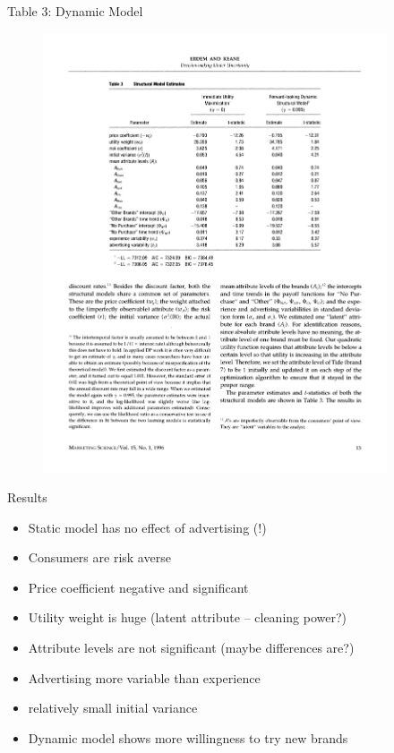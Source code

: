 \documentclass[xcolor=pdftex,dvipsnames,table,mathserif]{beamer}
\begin{document}
\begin{frame}{Table 3: Dynamic Model}
\begin{figure}[htbp]
\begin{center}
\includegraphics[width=4in]{resources/ek2.pdf}
\label{default}
\end{center}
\end{figure}
\end{frame}

\begin{frame}{Results}
\begin{itemize}
\item Static model has no effect of advertising (!)
\item Consumers are risk averse
\item Price coefficient negative and significant
\item Utility weight is huge (latent attribute -- cleaning power?)
\item Attribute levels are not significant (maybe differences are?)
\item Advertising more variable than experience
\item relatively small initial variance
\item Dynamic model shows \alert{more willingness to try new brands}
\end{itemize}
\end{frame}
\end{document}
